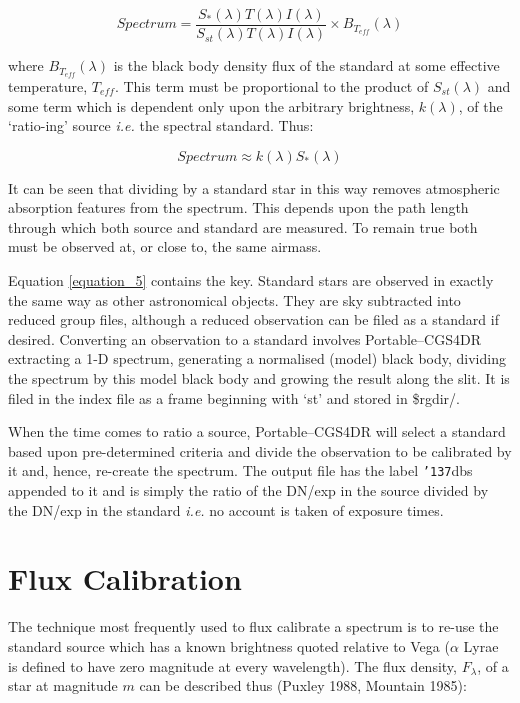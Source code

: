 \documentclass[a4paper]{book}
\renewcommand{\_}{{\tt\char'137}}
\begin{document}
\begin{equation}
  Spectrum = \frac{S_{*}(\lambda) T(\lambda) I(\lambda)}{S_{st}(\lambda) T(\lambda) I(\lambda)} \times B_{T_{eff}}(\lambda)
\label{equation_5}
\end{equation}

where $B_{T_{eff}}(\lambda)$ is the black body density flux of the
standard at some effective temperature, $T_{eff}$. This term must be
proportional to the product of $S_{st}(\lambda)$ and some term which is
dependent only upon the arbitrary brightness, $k(\lambda)$, of the
`ratio-ing' source {\em i.e.} the spectral standard. Thus: 

\begin{equation}
  Spectrum \approx k(\lambda) S_{*}(\lambda) \label{equation_6}
\end{equation}

It can be seen that dividing by a standard star in this way removes
atmospheric absorption features from the spectrum. This depends upon the
path length through which both source and standard are measured. To remain
true both must be observed at, or close to, the same airmass. 

Equation \ref{equation_5} contains the key. Standard stars are observed in
exactly the same way as other astronomical objects. They are sky
subtracted into reduced group files, although a reduced observation can be
filed as a standard if desired.  Converting an observation to a standard
involves Portable--CGS4DR extracting a 1-D spectrum, generating a
normalised (model) black body, dividing the spectrum by this model black
body and growing the result along the slit. It is filed in the index file
as a frame beginning with `st' and stored in {\sc \$rgdir/}. 

When the time comes to ratio a source, Portable--CGS4DR will select a
standard based upon pre-determined criteria and divide the observation to
be calibrated by it and, hence, re-create the spectrum. The output file
has the label \_dbs appended to it and is simply the ratio of the DN/exp
in the source divided by the DN/exp in the standard {\em i.e.} no account
is taken of exposure times. 

\section{Flux Calibration}
The technique most frequently used to flux calibrate a spectrum is to
re-use the standard source which has a known brightness quoted relative to
Vega ($\alpha$ Lyrae is defined to have zero magnitude at every
wavelength). The flux density, $F_{\lambda}$, of a star at magnitude $m$
can be described thus (Puxley 1988, Mountain 1985): 
\end{document}
